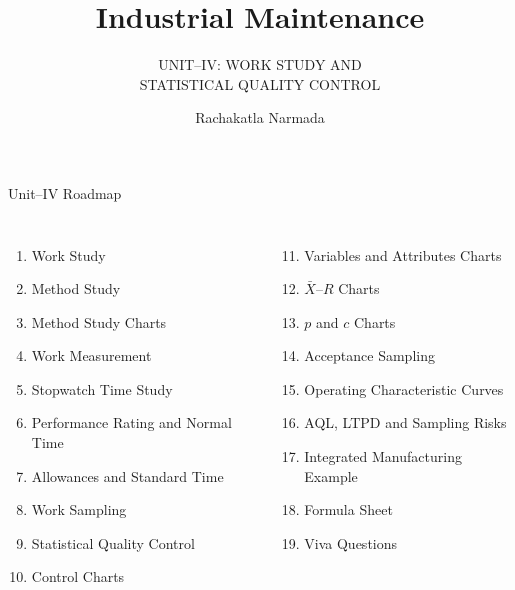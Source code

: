 \documentclass[aspectratio=169,10pt]{beamer}
\title{Industrial Maintenance}
\subtitle{
UNIT--IV: WORK STUDY AND\\
STATISTICAL QUALITY CONTROL
}
\author{Rachakatla Narmada}
\institute{
Assistant Professor\\
Sree Chaitanya College of Engineering
}
\date{}
\begin{document}
\maketitle


\begin{frame}{Unit--IV Roadmap}
\small

\begin{columns}[T,onlytextwidth]


\begin{enumerate}
    \item Work Study
    \item Method Study
    \item Method Study Charts
    \item Work Measurement
    \item Stopwatch Time Study
    \item Performance Rating and Normal Time
    \item Allowances and Standard Time
    \item Work Sampling
    \item Statistical Quality Control
    \item Control Charts
\end{enumerate}


\begin{enumerate}
    \setcounter{enumi}{10}
    \item Variables and Attributes Charts
    \item $\bar X$--$R$ Charts
    \item $p$ and $c$ Charts
    \item Acceptance Sampling
    \item Operating Characteristic Curves
    \item AQL, LTPD and Sampling Risks
    \item Integrated Manufacturing Example
    \item Formula Sheet
    \item Viva Questions
\end{enumerate}

\end{columns}

\end{frame}
\end{document}
